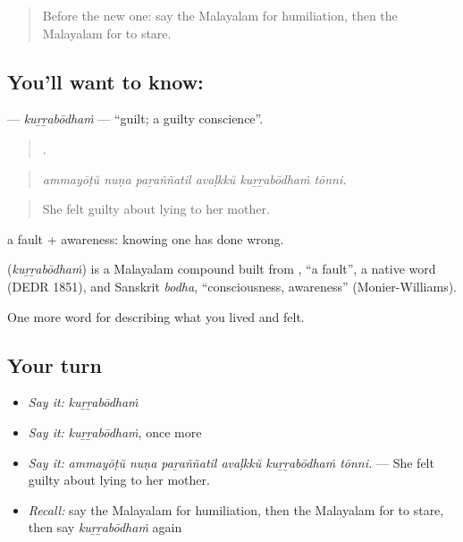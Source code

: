 \label{lesson:ML-C524-kurrabodham}



\begin{quote}
Before the new one: say the Malayalam for humiliation, then the Malayalam for to stare.
\end{quote}

\subsection*{You'll want to know: }
\textbf{} — \emph{kuṟṟabōdhaṁ} — \textquotedblleft{}guilt; a guilty conscience\textquotedblright{}.

\begin{quote}
     .
\end{quote}

\begin{quote}
\emph{ammayōṭŭ nuṇa paṟaññatil avaḷkkŭ kuṟṟabōdhaṁ tōnni.}
\end{quote}

\begin{quote}
She felt guilty about lying to her mother.
\end{quote}

 a fault +  awareness: knowing one has done wrong.

\begin{cousinweb}
\textbf{} (\emph{kuṟṟabōdhaṁ}) is a Malayalam compound built from , \textquotedblleft{}a fault\textquotedblright{}, a native word (DEDR 1851), and Sanskrit \emph{bodha}, \textquotedblleft{}consciousness, awareness\textquotedblright{} (Monier-Williams).
\end{cousinweb}

\begin{grammarlens}[title={What you've built}]
One more word for describing what you lived and felt.
\end{grammarlens}

\subsection*{Your turn}
\begin{itemize}
\raggedright
  \item \emph{Say it:} \emph{kuṟṟabōdhaṁ}
  \item \emph{Say it:} \emph{kuṟṟabōdhaṁ}, once more
  \item \emph{Say it:} \emph{ammayōṭŭ nuṇa paṟaññatil avaḷkkŭ kuṟṟabōdhaṁ tōnni.} — She felt guilty about lying to her mother.
  \item \emph{Recall:} say the Malayalam for humiliation, then the Malayalam for to stare, then say \emph{kuṟṟabōdhaṁ} again
\end{itemize}

